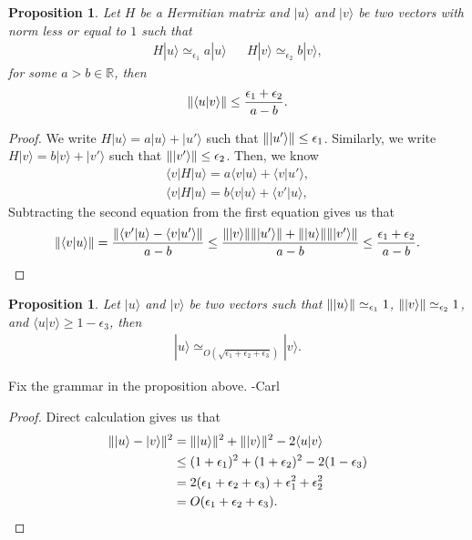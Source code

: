 \documentclass[11pt,letterpaper]{article}
\newcommand{\ket}[1]{|#1\rangle}
\newcommand{\bra}[1]{\langle#1|}
\newcommand{\braket}[2]{\langle#1|#2\rangle}
\DeclarePairedDelimiter{\norm}{\lVert}{\rVert}
\newcommand{\R}{\mathbb{R}}
\newcommand{\1}{\mathbb{1}}
\newcommand{\ep}{\epsilon}
\newcommand{\appd}[1]{\simeq_{#1}}
\def\carl#1{{\color{blue} #1 -Carl}}
\newtheorem{proposition}[theorem]{Proposition}
\theoremstyle{definition}
\begin{document}
\begin{proposition}
\label{prop:orthog}
	Let $H$ be a Hermitian matrix and $\ket{u}$ and $\ket{v}$ be two vectors with norm less or equal to $1$
	such that
	\begin{align*}
		H\ket{u} \appd{\ep_1} a \ket{u} &&
		H\ket{v} \appd{\ep_2} b \ket{v}, 
	\end{align*}
	for some $a > b \in \R$, then
	\begin{align*}
		\norm{\braket{u}{v}} \leq \frac{\ep_1+\ep_2}{a-b}.
	\end{align*}
\end{proposition}
\begin{proof}
	We write $H\ket{u} = a\ket{u} + \ket{u'}$ such that $\norm{\ket{u'}} \leq \ep_1$.
	Similarly, we write $H\ket{v} = b\ket{v} + \ket{v'}$ such that $\norm{\ket{v'}} \leq \ep_2$.
	Then, we know
	\begin{align*}
		\bra{v}H\ket{u} = a\braket{v}{u} + \braket{v}{u'},\\
		\bra{v}H\ket{u}  =b\braket{v}{u} + \braket{v'}{u},
	\end{align*}
	Subtracting the second equation from the first equation gives us that 
	\begin{align*}
		\norm{\braket{v}{u}} = \frac{\norm{\braket{v'}{u} -  \braket{v}{u'}}}{a-b} \leq \frac{\norm{\ket{v}}\norm{\ket{u'}}+
		\norm{\ket{u}}\norm{\ket{v'}}}{a-b} 
		\leq \frac{\ep_1+\ep_2}{a-b}.
	\end{align*}
\end{proof}
\begin{proposition}
\label{prop:close_vec}
	Let $\ket{u}$ and $\ket{v}$ be two vectors such that $\norm{\ket{u}} \appd{\ep_1} 1$,
	$\norm{\ket{v}} \appd{\ep_2} 1$, and $\braket{u}{v} \geq 1 - \ep_3$,
	then
	\begin{align*}
		\ket{u} \appd{O(\sqrt{\ep_1+\ep_2+\ep_3})} \ket{v}.
	\end{align*}
\end{proposition}
\carl{Fix the grammar in the proposition above.}
\begin{proof}
	Direct calculation gives us that
	\begin{align*}
		\norm{\ket{u} - \ket{v}}^2 &= \norm{\ket{u}}^2 + \norm{\ket{v}}^2 - 2\braket{u}{v} \\
		&\leq (1+\ep_1)^2 + (1+\ep_2)^2 - 2(1 - \ep_3)\\
		&= 2(\ep_1+\ep_2+\ep_3)+ \ep_1^2 + \ep_2^2\\
		& = O(\ep_1+\ep_2+\ep_3).
	\end{align*}
\end{proof}
\end{document}
